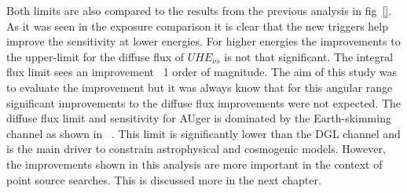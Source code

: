 Both limits are also compared to the results from the previous analysis in fig~\ref{}. As it was seen in the exposure comparison it is clear that the new triggers help improve the sensitivity at lower energies. For higher energies the improvements to the upper-limit for the diffuse flux of $UHE_{\nu s}$ is not that significant. The integral flux limit sees an improvement ~1 order of magnitude. The aim of this study was to evaluate the improvement but it was always know that for this angular range significant improvements to the diffuse flux improvements were not expected. The diffuse flux limit and sensitivity for AUger is dominated by the Earth-skimming channel as shown in ~\cite{}. This limit is significantly lower than the DGL channel and is the main driver to constrain astrophysical and cosmogenic models. However, the improvements shown in this analysis are more important in the context of point source searches. This is discussed more in the next chapter. 




